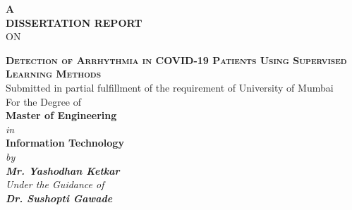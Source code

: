 \begin{titlepage}
\thispagestyle{empty}

{\centering
    {\Large\bf
        A\\
        \vspace{0.5cm}
        DISSERTATION REPORT}\\
    \vspace{0.5cm}
    {ON}
    \\
}

\vspace{0.4cm}
{\centering
    \large
    {\LARGE\bf \scshape{Detection of Arrhythmia in COVID-19 Patients Using Supervised Learning Methods}}\\
    \vspace{1cm}
    {Submitted in partial fulfillment of the requirement of University of Mumbai} \\
    {For the Degree of } \\
    \vspace{0.2cm}
    {\bf Master of Engineering } \\
    {\it{in}} \\
    {\bf Information Technology } \\
    \vspace{0.6cm}
    \it{by} \\
    \vspace{.2cm}
    \rm
    {\large \bf {Mr. Yashodhan Ketkar}}\\

    \vspace{0.8cm}
    {\it{Under the Guidance of}} \\
    \vspace{.2cm}
    \hspace{.05cm} {\large \textbf {Dr. Sushopti Gawade}}\\
    \vspace {1cm}

    \begin{figure}[h!]
    {\par}
    \end{figure}
    \vspace{0.2cm}

}
\end{titlepage}
